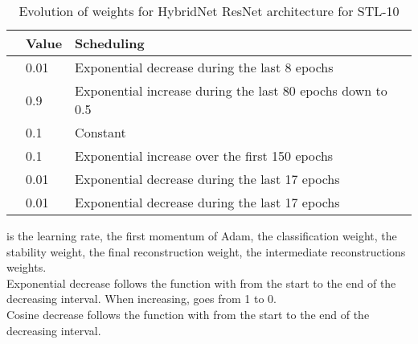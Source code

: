 \documentclass[runningheads]{llncs}
\begin{document}
\begin{table}[htbp]
\centering
\caption{Evolution of weights for HybridNet ResNet architecture for STL-10}
\label{tab:resnetschedstl}
\begin{threeparttable}
\setlength{\tabcolsep}{4pt}
\begin{tabular}{ l l l}
\toprule
 & Value & Scheduling \\
\midrule
 & 0.01 & Exponential decrease during the last 8 epochs \\
 & 0.9 & Exponential increase during the last 80 epochs down to 0.5 \\
 & 0.1 & Constant \\
 & 0.1 & Exponential increase over the first 150 epochs \\
 & 0.01 & Exponential decrease during the last 17 epochs \\
 & 0.01 & Exponential decrease during the last 17 epochs \\
\bottomrule
\end{tabular}
\begin{tablenotes}
 is the learning rate,  the first momentum of Adam,  the classification weight,  the stability weight,  the final reconstruction weight,  the intermediate reconstructions weights.\\
Exponential decrease follows the function  with  from the start to the end of the decreasing interval. When increasing,  goes from 1 to 0.\\
Cosine decrease follows the function  with  from the start to the end of the decreasing interval.
\end{tablenotes}
\end{threeparttable}
\end{table}


 
\end{document}
